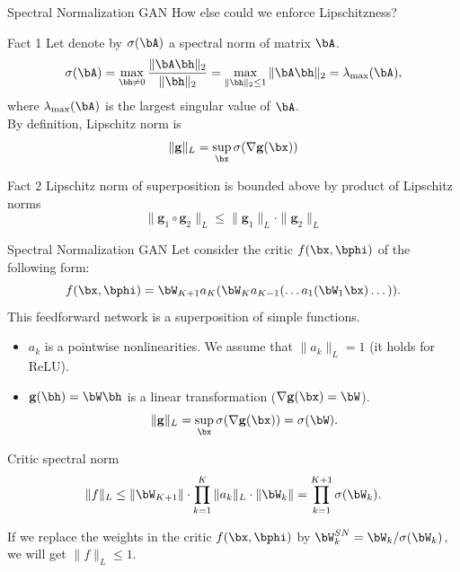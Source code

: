 

\begin{frame}
\titlepage
\end{frame}
\begin{frame}{Spectral Normalization GAN}
	How else could we enforce Lipschitzness?
	\begin{block}{Fact 1}
		Let denote by $\sigma(\bA)$ a spectral norm of matrix $\bA$.
		\[
			\sigma(\bA) = \max_{\bh \neq 0} \frac{\|\bA \bh\|_2}{\|\bh\|_2} = \max_{\|\bh\|_2 \leq 1} \| \bA \bh \|_2 = \lambda_{\text{max}}(\bA),
		\]
		where $\lambda_{\text{max}}(\bA)$ is the largest singular value of $\bA$. \\
		By definition, Lipschitz norm is 
		\[
			\| \mathbf{g} \|_L = \sup_\bx \sigma( \nabla \mathbf{g}(\bx))
		\]
	\end{block}
	\vspace{-0.5cm}
	\begin{block}{Fact 2}
		Lipschitz norm of superposition is bounded above by product of Lipschitz norms
		\vspace{-0.2cm}
		\[
			\| \mathbf{g}_1 \circ \mathbf{g}_2 \|_L \leq \| \mathbf{g}_1 \|_L \cdot \| \mathbf{g}_2\|_L
		\]
	\end{block}
\end{frame}
\begin{frame}{Spectral Normalization GAN}
	Let consider the critic $f(\bx, \bphi)$ of the following form:
	\[
		f(\bx, \bphi) = \bW_{K+1} a_K (\bW_K a_{K-1}(\dots a_1(\bW_1 \bx) \dots)).
	\]
	This feedforward network is a superposition of simple functions.
	\begin{itemize}
		\item $a_k$ is a pointwise nonlinearities. We assume that $\| a_k \|_L = 1$ (it holds for ReLU).
		\item $\mathbf{g}(\bh) = \bW \bh$ is a linear transformation ($\nabla \mathbf{g}(\bx) = \bW$).
		\[
			\| \mathbf{g} \|_L = \sup_\bx \sigma( \nabla \mathbf{g}(\bx)) = \sigma(\bW).
		\]
	\end{itemize}
	\vspace{-0.3cm}
	\begin{block}{Critic spectral norm}
		\vspace{-0.3cm}
		\[
			\| f \|_L \leq \| \bW_{K+1}\| \cdot \prod_{k=1}^K  \| a_k \|_L \cdot \| \bW_k \| = \prod_{k=1}^{K+1} \sigma(\bW_k).
		\]
		\vspace{-0.2cm}
	\end{block}
	If we replace the weights in the critic $f(\bx, \bphi)$ by $\bW^{SN}_k = \bW_k / \sigma(\bW_k)$, we will get $\| f\|_L \leq 1.$ \\
	
\end{frame}
